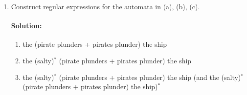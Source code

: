 \documentclass{article}
\begin{document}
\begin{enumerate}
\begin{enumerate}
\[\begin{codi}
                \mor q_0 the:-> q_1; 
                \mor q_1 salty:-> q_2; 
                \mor q_2 salty:[loop below] q_2; 
                \mor :[bend left] q_1 pirate:-> q_3; 
                \mor :[bend right,swap] q_1 pirates:-> q_4; 
                \mor :[swap] q_2 pirate:-> q_3; 
                \mor :[] q_2 pirates:-> q_4; 

                \mor q_3 plunders:-> q_5; 
                \mor :[swap] q_4 plunder:-> q_5; 

                \mor :[bend right=90,swap] q_7 and:-> q_0; 

                \mor q_5 the:-> q_6 ship:-> q_7; 
            \end{codi} \] 
        \fi
            \[ \begin{codi}
                \obj{&&q_2\\q_0&q_1&&q_4&q_5&q_6\\&&q_3\\};

                \draw (q_0) circle (1.3ex);
                \draw (q_1) circle (1.3ex);
                \draw (q_2) circle (1.3ex);
                \draw (q_3) circle (1.3ex);
                \draw (q_4) circle (1.3ex);
                \draw (q_5) circle (1.3ex);
                \draw (q_6) circle (1.3ex);
                \draw (q_6) circle (1.5ex);
                
                \mor q_0 the:-> q_1; 
                \mor q_1 salty:[loop below] q_1; 

                \mor :[swap] q_1 pirate:-> q_2; 
                \mor :[] q_1 pirates:-> q_3; 

                \mor q_2 plunders:-> q_4; 
                \mor :[swap] q_3 plunder:-> q_4; 
                \mor q_4 the:-> q_5; 
                \mor q_5 ship:-> q_6; 
                \mor :[bend right=90,swap] q_6 and:-> q_0; 
            \end{codi} \] 
        \item Construct regular expressions for the automata in (a), (b), (c).
            \paragraph{Solution: }
            \begin{enumerate}[label= (\alph*)] 
                \item the (pirate plunders + pirates plunder) the ship
                \item the (salty)$^*$ (pirate plunders + pirates plunder) the ship
                \item the (salty)$^*$ (pirate plunders + pirates plunder) the ship (and the (salty)$^*$ (pirate plunders + pirates plunder) the ship)$^{*}$
            \end{enumerate}


\end{enumerate}
\end{enumerate}
\end{document}

